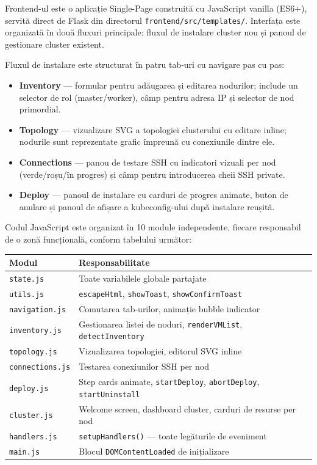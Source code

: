 \documentclass[12pt,a4paper]{report}
\begin{document}
Frontend-ul este o aplicație Single-Page construită cu JavaScript vanilla (ES6+), servită direct de Flask din directorul \texttt{frontend/src/templates/}. Interfața este organizată în două fluxuri principale: fluxul de instalare cluster nou și panoul de gestionare cluster existent.

Fluxul de instalare este structurat în patru tab-uri cu navigare pas cu pas:

\begin{itemize}
  \item \textbf{Inventory} — formular pentru adăugarea și editarea nodurilor; include un selector de rol (master/worker), câmp pentru adresa IP și selector de nod primordial.
  \item \textbf{Topology} — vizualizare SVG a topologiei clusterului cu editare inline; nodurile sunt reprezentate grafic împreună cu conexiunile dintre ele.
  \item \textbf{Connections} — panou de testare SSH cu indicatori vizuali per nod (verde/roșu/în progres) și câmp pentru introducerea cheii SSH private.
  \item \textbf{Deploy} — panoul de instalare cu carduri de progres animate, buton de anulare și panoul de afișare a kubeconfig-ului după instalare reușită.
\end{itemize}

Codul JavaScript este organizat în 10 module independente, fiecare responsabil de o zonă funcțională, conform tabelului următor:

\begin{center}
\begin{tabular}{|l|l|}
\hline
\textbf{Modul} & \textbf{Responsabilitate} \\
\hline
\texttt{state.js}      & Toate variabilele globale partajate \\
\texttt{utils.js}      & \texttt{escapeHtml}, \texttt{showToast}, \texttt{showConfirmToast} \\
\texttt{navigation.js} & Comutarea tab-urilor, animație bubble indicator \\
\texttt{inventory.js}  & Gestionarea listei de noduri, \texttt{renderVMList}, \texttt{detectInventory} \\
\texttt{topology.js}   & Vizualizarea topologiei, editorul SVG inline \\
\texttt{connections.js}& Testarea conexiunilor SSH per nod \\
\texttt{deploy.js}     & Step cards animate, \texttt{startDeploy}, \texttt{abortDeploy}, \texttt{startUninstall} \\
\texttt{cluster.js}    & Welcome screen, dashboard cluster, carduri de resurse per nod \\
\texttt{handlers.js}   & \texttt{setupHandlers()} — toate legăturile de eveniment \\
\texttt{main.js}       & Blocul \texttt{DOMContentLoaded} de inițializare \\
\hline
\end{tabular}
\end{center}
\end{document}
